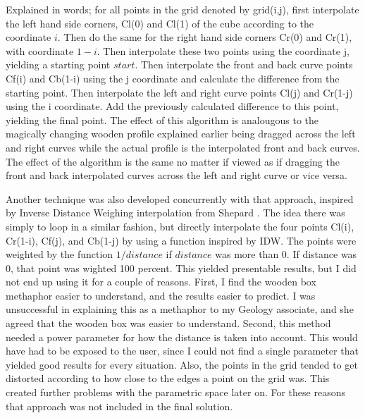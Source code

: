 \documentclass[a4paper,12pt]{report}
\begin{document}
Explained in words; for all points in the grid denoted by grid(i,j), first interpolate the left hand side corners, Cl(0) and Cl(1) of the cube according to the coordinate $i$. Then do the same for the right hand side corners Cr(0) and Cr(1), with coordinate $1-i$. Then interpolate these two points using the coordinate j, yielding a starting point $start$. Then interpolate the front and back curve points Cf(i) and Cb(1-i) using the j coordinate and calculate the difference from the starting point. Then interpolate the left and right curve points Cl(j) and Cr(1-j) using the i coordinate. Add the previously calculated difference to this point, yielding the final point. The effect of this algorithm is analougous to the magically changing wooden profile explained earlier being dragged across the left and right curves while the actual profile is the interpolated front and back curves. The effect of the algorithm is the same no matter if viewed as if dragging the front and back interpolated curves across the left and right curve or vice versa.



Another technique was also developed concurrently with that approach, inspired by Inverse Distance Weighing interpolation from Shepard \cite{shepard1968two}. The idea there was simply to loop in a similar fashion, but directly interpolate the four points Cl(i), Cr(1-i), Cf(j), and Cb(1-j) by using a function inspired by IDW. The points were weighted by the function $1/distance$ if $distance$ was more than 0. If distance was 0, that point was wighted 100 percent. This yielded presentable results, but I did not end up using it for a couple of reasons. First, I find the wooden box methaphor easier to understand, and the results easier to predict. I was unsuccessful in explaining this as a methaphor to my Geology associate, and she agreed that the wooden box was easier to understand. Second, this method needed a power parameter for how the distance is taken into account. This would have had to be exposed to the user, since I could not find a single parameter that yielded good results for every situation. Also, the points in the grid tended to get distorted according to how close to the edges a point on the grid was. This created further problems with the parametric space later on. For these reasons that approach was not included in the final solution.
\end{document}
